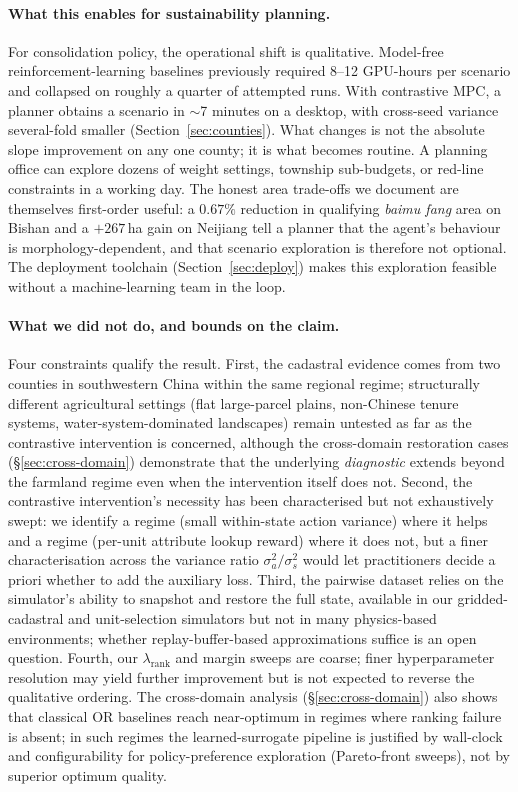 \documentclass[11pt]{article}
\begin{document}
\paragraph{What this enables for sustainability planning.} For consolidation policy, the operational shift is qualitative. Model-free reinforcement-learning baselines previously required 8--12 GPU-hours per scenario and collapsed on roughly a quarter of attempted runs. With contrastive MPC, a planner obtains a scenario in $\sim$7 minutes on a desktop, with cross-seed variance several-fold smaller (Section~\ref{sec:counties}). What changes is not the absolute slope improvement on any one county; it is what becomes routine. A planning office can explore dozens of weight settings, township sub-budgets, or red-line constraints in a working day. The honest area trade-offs we document are themselves first-order useful: a $0.67\%$ reduction in qualifying \textit{baimu fang} area on Bishan and a $+267$\,ha gain on Neijiang tell a planner that the agent's behaviour is morphology-dependent, and that scenario exploration is therefore not optional. The deployment toolchain (Section~\ref{sec:deploy}) makes this exploration feasible without a machine-learning team in the loop.

\paragraph{What we did not do, and bounds on the claim.} Four constraints qualify the result. First, the cadastral evidence comes from two counties in southwestern China within the same regional regime; structurally different agricultural settings (flat large-parcel plains, non-Chinese tenure systems, water-system-dominated landscapes) remain untested as far as the contrastive intervention is concerned, although the cross-domain restoration cases (\S\ref{sec:cross-domain}) demonstrate that the underlying \emph{diagnostic} extends beyond the farmland regime even when the intervention itself does not. Second, the contrastive intervention's necessity has been characterised but not exhaustively swept: we identify a regime (small within-state action variance) where it helps and a regime (per-unit attribute lookup reward) where it does not, but a finer characterisation across the variance ratio $\sigma_a^2 / \sigma_s^2$ would let practitioners decide a priori whether to add the auxiliary loss. Third, the pairwise dataset relies on the simulator's ability to snapshot and restore the full state, available in our gridded-cadastral and unit-selection simulators but not in many physics-based environments; whether replay-buffer-based approximations suffice is an open question. Fourth, our $\lambda_{\text{rank}}$ and margin sweeps are coarse; finer hyperparameter resolution may yield further improvement but is not expected to reverse the qualitative ordering. The cross-domain analysis (\S\ref{sec:cross-domain}) also shows that classical OR baselines reach near-optimum in regimes where ranking failure is absent; in such regimes the learned-surrogate pipeline is justified by wall-clock and configurability for policy-preference exploration (Pareto-front sweeps), not by superior optimum quality.
\end{document}
